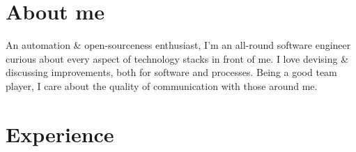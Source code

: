 \documentclass[letterpaper]{twentysecondcv} %
\begin{document}
\makeprofile %

\section{About me}

An automation \& open-sourceness enthusiast, I'm an all-round software engineer curious about every aspect of technology stacks in front of me.
I love devising \& discussing improvements, both for software and processes.
Being a good team player, I care about the quality of communication with those around me.


\section{Experience}
\end{document}
